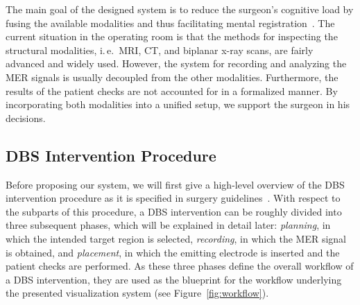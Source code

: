 \documentclass{vgtc}                          %
\begin{document}
The main goal of the designed system is to reduce the surgeon's cognitive load by fusing the available modalities and thus facilitating mental registration~\cite{Tory1998}. The current situation in the operating room is that the methods for inspecting the structural modalities, i.\,e.~MRI, CT, and biplanar x-ray scans, are fairly advanced and widely used. However, the system for recording and analyzing the MER signals is usually decoupled from the other modalities. Furthermore, the results of the patient checks are not accounted for in a formalized manner. By incorporating both modalities into a unified setup, we support the surgeon in his decisions.

\subsection{DBS Intervention Procedure}\label{sec:overview:procedure}
Before proposing our system, we will first give a high-level overview of the DBS intervention procedure as it is specified in surgery guidelines~\cite{Hemm2010}. With respect to the subparts of this procedure, a DBS intervention can be roughly divided into three subsequent phases, which will be explained in detail later: \emph{planning}, in which the intended target region is selected, \emph{recording}, in which the MER signal is obtained, and \emph{placement}, in which the emitting electrode is inserted and the patient checks are performed. As these three phases define the overall workflow of a DBS intervention, they are used as the blueprint for the workflow underlying the presented visualization system (see Figure~\ref{fig:workflow}).
\end{document}
